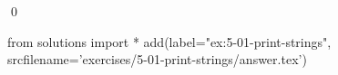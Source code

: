 
\begin{ex}
  \label{ex:5-01-print-strings}
  
  \qed
\end{ex}
\begin{python0}
from solutions import *
add(label="ex:5-01-print-strings",
    srcfilename='exercises/5-01-print-strings/answer.tex')
\end{python0}
